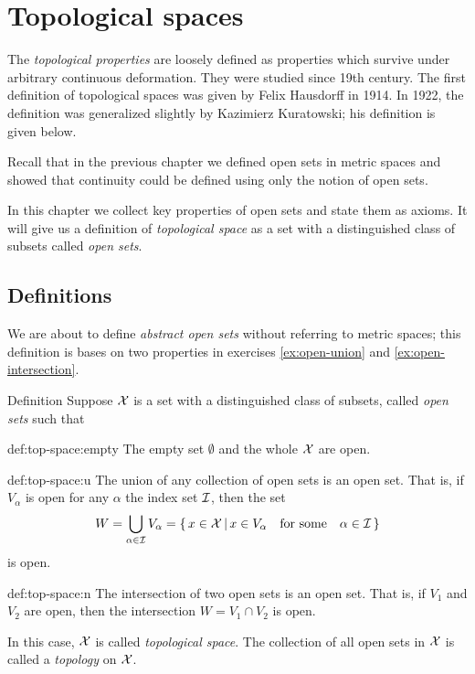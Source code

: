 \chapter{Topological spaces}

The \emph{topological properties} are loosely defined as properties which survive under arbitrary continuous deformation.
They were studied since 19th century.
The first definition of topological spaces was given by Felix Hausdorff in 1914.
In 1922, the definition was generalized slightly by Kazimierz Kuratowski; his definition is given below.

Recall that in the previous chapter we defined open sets in metric spaces 
and showed that continuity could be defined using only the notion of open sets.

In this chapter we collect key properties of open sets and state them as axioms.
It will give us a definition of \textit{topological space} as a set with a distinguished class of subsets called \textit{open sets}.

\section{Definitions}

We are about to define \textit{abstract open sets} without referring to metric spaces;
this definition is bases on two properties in exercises \ref{ex:open-union} and \ref{ex:open-intersection}.

\begin{thm}{Definition}\label{def:top-space}
Suppose $\mathcal{X}$ is a set 
with a distinguished class of subsets, called \emph{open sets} such that

\begin{subthm}{def:top-space:empty}
The empty set $\emptyset$ and the whole $\mathcal{X}$ are open.
\end{subthm}

\begin{subthm}{def:top-space:u}
The union of any collection of open sets is an open set.
That is, if $V_\alpha$ is open for any $\alpha$ the index set $\mathcal{I}$, 
then the set
\[W=\bigcup_{\alpha\in \mathcal{I}} V_\alpha
=
\left\{\,{x\in \mathcal{X}}\,\middle|\,{x\in V_\alpha\quad\text{for some}\quad\alpha\in \mathcal{I}}\,\right\}\]
is open.
\end{subthm}

\begin{subthm}{def:top-space:n}
The intersection of two open sets is an open set.  
That is, if $V_1$ and $V_2$ are open, then the intersection $W=V_1 \cap V_2$ is open. 
\end{subthm}

In this case, $\mathcal{X}$ is called \emph{topological space}.
The collection of all open sets in  $\mathcal{X}$ is called a \emph{topology} on $\mathcal{X}$.

\end{thm}

